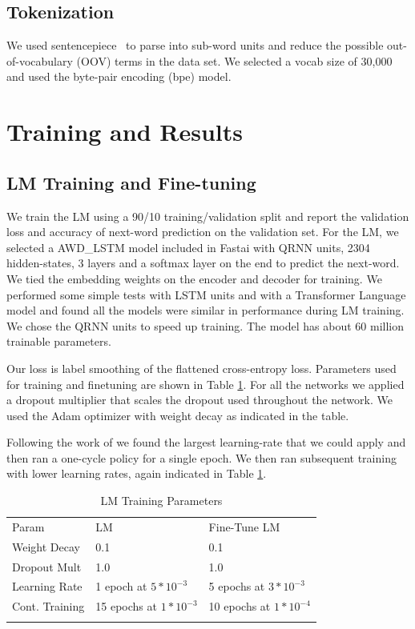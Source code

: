 \documentclass[smallcondensed]{svjour3}     %
\begin{document}
\subsection{Tokenization}
We used sentencepiece~\cite{SentencePiece:DBLP:journals/corr/abs-1808-06226} to parse into sub-word units and reduce the possible out-of-vocabulary (OOV) terms in the data set.  We selected a vocab size of 30,000 and used the byte-pair encoding (bpe) model. 

\section{Training and Results}
\label{sec:4}
\subsection{LM Training and Fine-tuning}
We train the LM using a 90/10 training/validation split and report the validation loss and accuracy of next-word prediction on the validation set.  For the LM, we selected a AWD\_LSTM \cite{Merity:DBLP:journals/corr/abs-1708-02182} model included in Fastai with QRNN\cite{Bradbury:DBLP:journals/corr/BradburyMXS16} units, 2304 hidden-states, 3 layers and a softmax layer on the end to predict the next-word.  We tied the embedding weights on the encoder and decoder for training.  We performed some simple tests with LSTM units and with a Transformer Language model and found all the models were similar in performance during LM training.  We chose the QRNN units to speed up training. The model has about 60 million trainable parameters.  

Our loss is label smoothing\cite{Labelsmoothing:DBLP:journals/corr/PereyraTCKH17} of the flattened cross-entropy loss. 
Parameters used for training and finetuning are shown in Table \ref{tab:tab_training}.
For all the networks we applied a dropout multiplier that scales the dropout used throughout the network.  We used the Adam optimizer with weight decay as indicated in the table.  

Following the work of \cite{Smith:DBLP:journals/corr/abs-1803-09820}  we found the largest learning-rate that we could apply and then ran a one-cycle policy \cite{} for a single epoch. We then ran subsequent training with lower learning rates, again indicated in Table \ref{tab:tab_training}.

\begin{table}[ht]
	\caption{LM Training Parameters}
	\label{tab:tab_training}       %
\begin{tabular}{lll}
	\hline\noalign{\smallskip}
	Param & LM & Fine-Tune LM \\
	\noalign{\smallskip}\hline\noalign{\smallskip}
	Weight Decay & 0.1 & 0.1 \\
	Dropout Mult & 1.0 & 1.0 \\
	Learning Rate & 1 epoch at $5*10^{-3}$ & 5 epochs at $3*10^{-3}$ \\
    Cont. Training & 15 epochs at $1*10^{-3}$ & 10 epochs at $1*10^{-4}$\\
	\noalign{\smallskip}\hline
\end{tabular}
\end{table}
\end{document}
